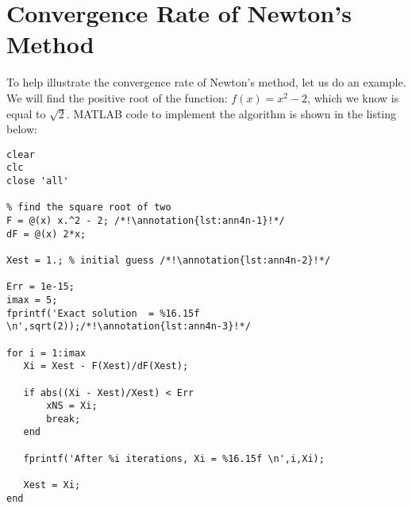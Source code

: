 \section{Convergence Rate of Newton's Method}
To help illustrate the convergence rate of Newton's method, let us do an example.  We will find the positive root of the function: $f(x) = x^2 - 2$, which we know is equal to $\sqrt{2}$.  MATLAB code to implement the algorithm is shown in the listing below:
\begin{lstlisting}[name=lec4n-ex1, style=myMatlab]
clear
clc
close 'all'

% find the square root of two
F = @(x) x.^2 - 2; /*!\annotation{lst:ann4n-1}!*/
dF = @(x) 2*x;

Xest = 1.; % initial guess /*!\annotation{lst:ann4n-2}!*/

Err = 1e-15;
imax = 5;
fprintf('Exact solution  = %16.15f \n',sqrt(2));/*!\annotation{lst:ann4n-3}!*/

for i = 1:imax
   Xi = Xest - F(Xest)/dF(Xest); 
    
   if abs((Xi - Xest)/Xest) < Err
       xNS = Xi;
       break;
   end
   
   fprintf('After %i iterations, Xi = %16.15f \n',i,Xi);
   
   Xest = Xi;      
end
\end{lstlisting}


